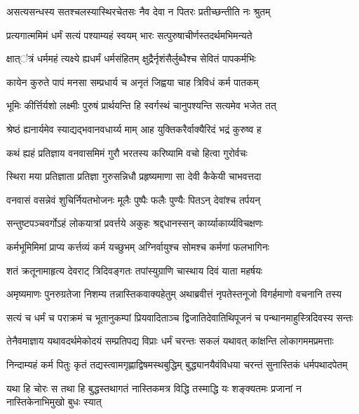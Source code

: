 \twolineshloka
{असत्यसन्धस्य सतश्चलस्यास्थिरचेतसः}
{नैव देवा न पितरः प्रतीच्छन्तीति नः श्रुतम्} %

\twolineshloka
{प्रत्यगात्ममिमं धर्मं सत्यं पश्याम्यहं स्वयम्}
{भारः सत्पुरुषाचीर्णस्तदर्थमभिमन्यते} %

\twolineshloka
{क्षात्ऺत्रं धर्ममहं त्यक्ष्ये ह्यधर्मं धर्मसंहितम्}
{क्षुद्रैर्नृशंसैर्लुब्धैश्च सेवितं पापकर्मभिः} %

\twolineshloka
{कायेन कुरुते पापं मनसा सम्प्रधार्य च}
{अनृतं जिह्वया चाह त्रिविधं कर्म पातकम्} %

\twolineshloka
{भूमिः कीर्त्तिर्यशो लक्ष्मीः पुरुषं प्रार्थयन्ति हि}
{स्वर्गस्थं चानुपश्यन्ति सत्यमेव भजेत तत्} %

\twolineshloka
{श्रेष्ठं ह्यनार्यमेव स्याद्यद्भवानवधार्य्य माम्}
{आह युक्तिकरैर्वाक्यैरिदं भद्रं कुरुष्व ह} %

\twolineshloka
{कथं ह्यहं प्रतिज्ञाय वनवासमिमं गुरौ}
{भरतस्य करिष्यामि वचो हित्वा गुरोर्वचः} %

\twolineshloka
{स्थिरा मया प्रतिज्ञाता प्रतिज्ञा गुरुसन्निधौ}
{प्रहृष्यमाणा सा देवी कैकेयी चाभवत्तदा} %

\twolineshloka
{वनवासं वसन्नेवं शुचिर्नियतभोजनः}
{मूलैः पुष्पैः फलैः पुण्यैः पितऽन् देवांश्च तर्पयन्} %

\twolineshloka
{सन्तुष्टपञ्चवर्गोऽहं लोकयात्रां प्रवर्त्तये}
{अकुहः श्रद्दधानस्सन् कार्य्याकार्य्यविचक्षणः} %

\twolineshloka
{कर्मभूमिमिमां प्राप्य कर्त्तव्यं कर्म यच्छुभम्}
{अग्निर्वायुश्च सोमश्च कर्मणां फलभागिनः} %

\twolineshloka
{शतं क्रतूनामाहृत्य देवराट् त्रिदिवङ्गतः}
{तपांस्युग्राणि चास्थाय दिवं याता महर्षयः} %

\twolineshloka
{अमृष्यमाणः पुनरुग्रतेजा निशम्य तन्नास्तिकवाक्यहेतुम्}
{अथाब्रवीत्तं नृपतेस्तनूजो विगर्हमाणो वचनानि तस्य} %

\twolineshloka
{सत्यं च धर्मं च पराक्रमं च भूतानुकम्पां प्रियवादिताञ्च}
{द्विजातिदेवातिथिपूजनं च पन्थानमाहुस्त्रिदिवस्य सन्तः} %

\twolineshloka
{तेनैवमाज्ञाय यथावदर्थमेकोदयं सम्प्रतिपद्य विप्राः}
{धर्मं चरन्तः सकलं यथावत् कांक्षन्ति लोकागममप्रमत्ताः} %

\twolineshloka
{निन्दाम्यहं कर्म पितुः कृतं तद्यस्त्वामगृह्णाद्विषमस्थबुद्धिम्}
{बुद्ध्यानयैवंविधया चरन्तं सुनास्तिकं धर्मपथादपेतम्} %

\twolineshloka
{यथा हि चोरः स तथा हि बुद्धस्तथागतं नास्तिकमत्र विद्धि}
{तस्माद्धि यः शङ्क्यतमः प्रजानां न नास्तिकेनाभिमुखो बुधः स्यात्} %

